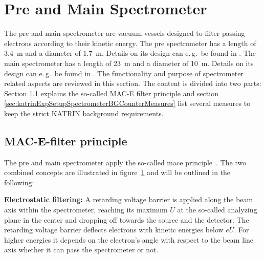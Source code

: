 \section{Pre and Main Spectrometer}
\label{sec:katrinExpSetupSpectrometer}
The pre and main spectrometer are vacuum vessels designed to filter passing electrons according to their kinetic energy. The pre spectrometer has a length of \SI{3.4}{m} and a diameter of \SI{1.7}{m}. Details on its design can e.\,g.~be found in \cite{Prall2012}. The main spectrometer has a length of \SI{23}{m} and a diameter of \SI{10}{m}. Details on its design can e.\,g.~be found in \cite{Valerius2009}. The functionality and purpose of spectrometer related aspects are reviewed in this section. The content is divided into two parts: Section \ref{sec:katrinExpSetupSpectrometerMACE} explains the so-called MAC-E filter principle and section \ref{sec:katrinExpSetupSpectrometerBGCounterMeasures} list several measures to keep the strict KATRIN background requirements.

\subsection{MAC-E-filter principle}
\label{sec:katrinExpSetupSpectrometerMACE}
\begin{figure}[t]
	\label{fig:katrinExpSetupSpectrometer}
\end{figure}

The pre and main spectrometer apply the so-called \gls{mace} principle~\cite{Angrik:2005ep}. The two combined concepts are illustrated in figure~\ref{fig:katrinExpSetupSpectrometer} and will be outlined in the following:

{\par \textbf{Electrostatic filtering:}
A retarding voltage barrier is applied along the beam axis within the spectrometer, reaching its maximum $U$ at the so-called analyzing plane in the center and dropping off towards the source and the detector. The retarding voltage barrier deflects electrons with kinetic energies below $eU$. For higher energies it depends on the electron's angle with respect to the beam line axis whether it can pass the spectrometer or not. }

